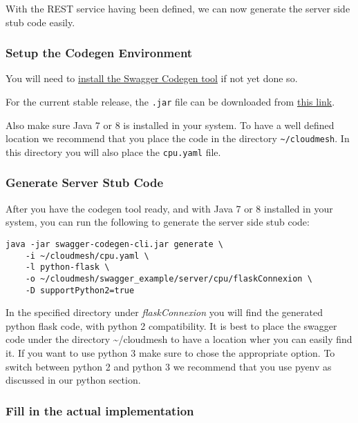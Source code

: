 With the REST service having been defined, we can now generate the
server side stub code easily.

\hypertarget{setup-the-codegen-environment}{%
\subsubsection{Setup the Codegen
Environment}\label{setup-the-codegen-environment}}

You will need to \href{https://swagger.io/docs/swagger-tools/}{install
the Swagger Codegen tool} if not yet done so.

For the current stable release, the \texttt{.jar} file can be downloaded
from
\href{https://oss.sonatype.org/content/repositories/releases/io/swagger/swagger-codegen-cli/2.2.1/swagger-codegen-cli-2.2.1.jar}{this
link}.

Also make sure Java 7 or 8 is installed in your system. To have a well
defined location we recommend that you place the code in the directory
\texttt{\textasciitilde{}/cloudmesh}. In this directory you will also
place the \texttt{cpu.yaml} file.

\hypertarget{generate-server-stub-code}{%
\subsubsection{Generate Server Stub
Code}\label{generate-server-stub-code}}

After you have the codegen tool ready, and with Java 7 or 8 installed in
your system, you can run the following to generate the server side stub
code:

\begin{verbatim}
java -jar swagger-codegen-cli.jar generate \
    -i ~/cloudmesh/cpu.yaml \
    -l python-flask \
    -o ~/cloudmesh/swagger_example/server/cpu/flaskConnexion \
    -D supportPython2=true
\end{verbatim}

In the specified directory under \emph{flaskConnexion} you will find the
generated python flask code, with python 2 compatibility. It is best to
place the swagger code under the directory \textasciitilde{}/cloudmesh
to have a location wher you can easily find it. If you want to use
python 3 make sure to chose the appropriate option. To switch between
python 2 and python 3 we recommend that you use pyenv as discussed in
our python section.

\hypertarget{fill-in-the-actual-implementation}{%
\subsubsection{Fill in the actual
implementation}\label{fill-in-the-actual-implementation}}

